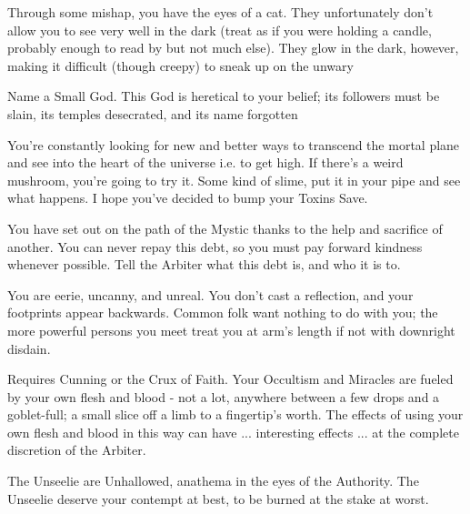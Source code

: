 {  

  Through some mishap, you have the eyes of a cat.  They unfortunately don't allow you to see very well in the dark (treat as if you were holding a candle, probably enough to read by but not much else).  They glow in the dark, however, making it difficult (though creepy) to sneak up on the unwary


  Name a Small God.  This God is heretical to your belief; its followers must be slain, its temples desecrated, and its name forgotten


  You're constantly looking for new and better ways to transcend the mortal plane and see into the heart of the universe i.e. to get high.  If there's a weird mushroom, you're going to try it.  Some kind of slime, put it in your pipe and see what happens.  I hope you've decided to bump your Toxins Save.


  You have set out on the path of the Mystic thanks to the help and sacrifice of another.  You can never repay this debt, so you must pay forward kindness whenever possible.  Tell the Arbiter what this debt is, and who it is to.


  You are eerie, uncanny, and unreal.  You don't cast a reflection, and your footprints appear backwards.  Common folk want nothing to do with you; the more powerful persons you meet treat you at arm's length if not with downright disdain.  


  Requires Cunning or the Crux of Faith.  Your Occultism and Miracles are fueled by your own flesh and blood - not a lot, anywhere between a few drops and a goblet-full; a small slice off a limb to a fingertip's worth.  The effects of using your own flesh and blood in this way can have ... interesting effects ... at the complete discretion of the Arbiter.


  The Unseelie are Unhallowed, anathema in the eyes of the Authority.  The Unseelie deserve your contempt at best, to be burned at the stake at worst.

}
